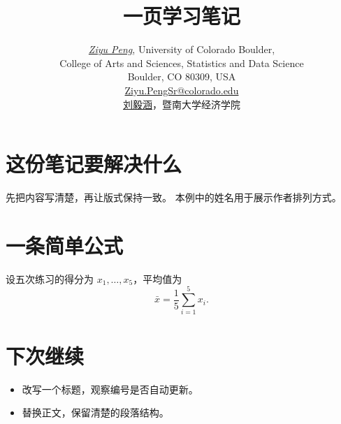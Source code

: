 \documentclass[UTF8,a4paper,fontset=fandol]{ctexart}
\title{一页学习笔记}
\author{\href{https://github.com/pzy54154631-hub}{\textit{Ziyu Peng}}, University of Colorado Boulder,
  \\[0.1em]College of Arts and Sciences, Statistics and Data Science
  \\[0.1em]Boulder, CO 80309, USA
  \\[0.1em]\href{mailto:Ziyu.PengSr@colorado.edu}{Ziyu.PengSr@colorado.edu}
  \\[0.35em]
  \href{https://pzy54154631-hub.github.io/liuyihan/}{刘毅涵}，暨南大学经济学院}
\date{}
\begin{document}
\maketitle

\section{这份笔记要解决什么}
先把内容写清楚，再让版式保持一致。
本例中的姓名用于展示作者排列方式。

\section{一条简单公式}
设五次练习的得分为 \(x_1,\ldots,x_5\)，平均值为
\[
  \bar{x}=\frac{1}{5}\sum_{i=1}^{5}x_i.
\]

\section{下次继续}
\begin{itemize}
  \item 改写一个标题，观察编号是否自动更新。
  \item 替换正文，保留清楚的段落结构。
\end{itemize}
\end{document}
